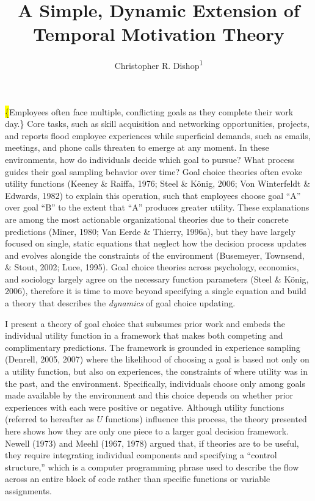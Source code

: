 \documentclass[english,,man]{apa6}
\title{A Simple, Dynamic Extension of Temporal Motivation Theory}
\author{Christopher R. Dishop\textsuperscript{1}}
\date{}
\affiliation{
\vspace{0.5cm}
\textsuperscript{1} Michigan State University}
\theoremstyle{definition}
\theoremstyle{definition}
\theoremstyle{definition}
\theoremstyle{remark}
\begin{document}
\maketitle

\hl\{Employees often face multiple, conflicting goals as they complete
their work day.\} Core tasks, such as skill acquisition and networking
opportunities, projects, and reports flood employee experiences while
superficial demands, such as emails, meetings, and phone calls threaten
to emerge at any moment. In these environments, how do individuals
decide which goal to pursue? What process guides their goal sampling
behavior over time? Goal choice theories often evoke utility functions
(Keeney \& Raiffa, 1976; Steel \& König, 2006; Von Winterfeldt \&
Edwards, 1982) to explain this operation, such that employees choose
goal \enquote{A} over goal \enquote{B} to the extent that \enquote{A}
produces greater utility. These explanations are among the most
actionable organizational theories due to their concrete predictions
(Miner, 1980; Van Eerde \& Thierry, 1996a), but they have largely
focused on single, static equations that neglect how the decision
process updates and evolves alongide the constraints of the environment
(Busemeyer, Townsend, \& Stout, 2002; Luce, 1995). Goal choice theories
across psychology, economics, and sociology largely agree on the
necessary function parameters (Steel \& König, 2006), therefore it is
time to move beyond specifying a single equation and build a theory that
describes the \emph{dynamics} of goal choice updating.

I present a theory of goal choice that subsumes prior work and embeds
the individual utility function in a framework that makes both competing
and complimentary predictions. The framework is grounded in experience
sampling (Denrell, 2005, 2007) where the likelihood of choosing a goal
is based not only on a utility function, but also on experiences, the
constraints of where utility was in the past, and the environment.
Specifically, individuals choose only among goals made available by the
environment and this choice depends on whether prior experiences with
each were positive or negative. Although utility functions (referred to
hereafter as \(U\) functions) influence this process, the theory
presented here shows how they are only one piece to a larger goal
decision framework. Newell (1973) and Meehl (1967, 1978) argued that, if
theories are to be useful, they require integrating individual
components and specifying a \enquote{control structure,} which is a
computer programming phrase used to describe the flow across an entire
block of code rather than specific functions or variable assignments.
\end{document}
